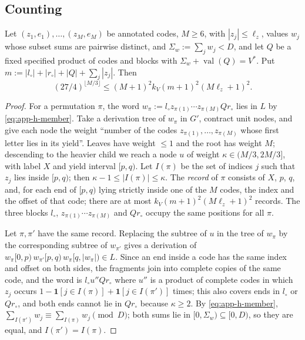 \subsection{Counting}

\begin{lemma}
\label{lem:app-h-count}
Let $(z_1,e_1),\ldots,(z_M,e_M)$ be annotated codes, $M\ge6$, with
$|z_j|\le\ell_z$, values $w_j$ whose subset sums are pairwise distinct, and
$\Sigma_w:=\sum_jw_j<D$, and let $Q$ be a fixed specified product of codes and
blocks with $\Sigma_w+\operatorname{val}(Q)=V^*$.  Put $m:=|l_\circ|+|r_\circ|
+|Q|+\sum_j|z_j|$.  Then
\[
 (27/4)^{\lfloor M/3\rfloor}\le(M+1)^2k_V(m+1)^2(M\ell_z+1)^2.
\]
\end{lemma}

\begin{proof}
For a permutation $\pi$, the word $w_\pi:=l_\circ z_{\pi(1)}\cdots
z_{\pi(M)}Qr_\circ$ lies in $L$ by \eqref{eq:app-h-member}.  Take a
derivation tree of $w_\pi$ in $G'$, contract unit nodes, and give each node the
weight ``number of the codes $z_{\pi(1)},\ldots,z_{\pi(M)}$ whose first letter
lies in its yield''.  Leaves have weight $\le1$ and the root has weight $M$;
descending to the heavier child we reach a node $u$ of weight
$\kappa\in(M/3,2M/3]$, with label $X$ and yield interval $[p,q)$.  Let $I(\pi)$
be the set of indices $j$ such that $z_j$ lies inside $[p,q)$; then
$\kappa-1\le|I(\pi)|\le\kappa$.  The \emph{record} of $\pi$ consists of $X$,
$p$, $q$, and, for each end of $[p,q)$ lying strictly inside one of the $M$
codes, the index and the offset of that code; there are at most
$k_V(m+1)^2(M\ell_z+1)^2$ records.  The three blocks $l_\circ$, $z_{\pi(1)}\cdots
z_{\pi(M)}$ and $Qr_\circ$ occupy the same positions for all $\pi$.

Let $\pi,\pi'$ have the same record.  Replacing the subtree of $u$ in the tree
of $w_\pi$ by the corresponding subtree of $w_{\pi'}$ gives a derivation of
$w_\pi[0,p)\,w_{\pi'}[p,q)\,w_\pi[q,|w_\pi|)\in L$.  Since an end inside a code
has the same index and offset on both sides, the fragments join into complete
copies of the same code, and the word is $l_\circ u''Qr_\circ$ where $u''$ is a
product of complete codes in which $z_j$ occurs
$1-\mathbf 1[j\in I(\pi)]+\mathbf 1[j\in I(\pi')]$ times; this also covers ends
in $l_\circ$ or $Qr_\circ$, and both ends cannot lie in $Qr_\circ$ because
$\kappa\ge2$.  By \eqref{eq:app-h-member},
$\sum_{I(\pi')}w_j\equiv\sum_{I(\pi)}w_j\pmod D$; both sums lie in
$[0,\Sigma_w)\subseteq[0,D)$, so they are equal, and $I(\pi')=I(\pi)$.


\end{proof}
